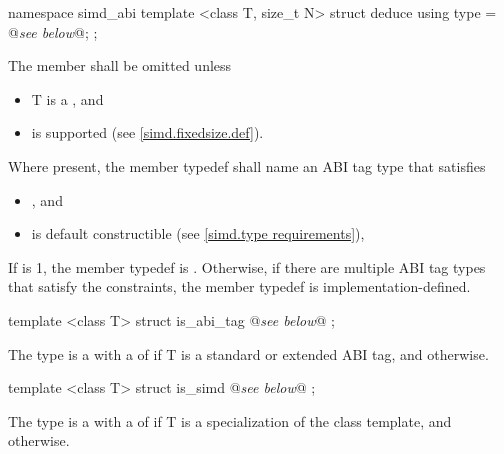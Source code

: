 \begin{itemdecl}
namespace simd_abi {
  template <class T, size_t N> struct deduce { using type = @\emph{see below}@; };
}
\end{itemdecl}
\begin{itemdescr}
  \pnum The member  shall be omitted unless
  \begin{itemize}
    \item \type T is a \realArithmeticType{}, and
    \item \fixedsizeN is supported (see \ref{simd.fixedsize.def}).
  \end{itemize}

  \pnum Where present, the member typedef  shall name an ABI tag type that satisfies
  \begin{itemize}
    \item {}, and
    \item \simd[<T, type>] is default constructible (see \ref{simd.type requirements}),
  \end{itemize}

  If  is 1, the member typedef  is .
  Otherwise, if there are multiple ABI tag types that satisfy the constraints, the member typedef  is implementation-defined.

  \pnum{}
\end{itemdescr}

\begin{itemdecl}
template <class T> struct is_abi_tag { @\emph{see below}@ };
\end{itemdecl}
\begin{itemdescr}
  \pnum The type  is a \UnaryTypeTrait with a \BaseCharacteristic of  if \type T is a standard or extended ABI tag, and  otherwise.

  \pnum{}
\end{itemdescr}

\begin{itemdecl}
template <class T> struct is_simd { @\emph{see below}@ };
\end{itemdecl}
\begin{itemdescr}
  \pnum The type  is a \UnaryTypeTrait with a \BaseCharacteristic of  if \type T is a specialization of the \simd class template, and  otherwise.

  \pnum{}
\end{itemdescr}


